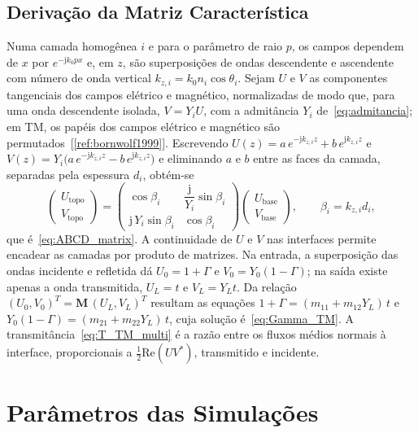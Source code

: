 \documentclass[12pt,a4paper,oneside]{book}
\theoremstyle{remark}
\newcommand{\jj}{\mathrm{j}}
\newcommand{\citar}[1]{[\ref{ref:#1}]}
\theoremstyle{plain}
\theoremstyle{definition}
\begin{document}
\section{Derivação da Matriz Característica}
\label{app:abcd_deriv}

Numa camada homogênea $i$ e para o parâmetro de raio $p$, os campos dependem de
$x$ por $e^{-\jj k_0px}$ e, em $z$, são superposições de ondas descendente e
ascendente com número de onda vertical $k_{z,i}=k_0n_i\cos\theta_i$. Sejam $U$ e
$V$ as componentes tangenciais dos campos elétrico e magnético, normalizadas de
modo que, para uma onda descendente isolada, $V=Y_iU$, com a admitância $Y_i$
de~\eqref{eq:admitancia}; em TM, os papéis dos campos elétrico e magnético são
permutados~\citar{bornwolf1999}. Escrevendo
$U(z)=a\,e^{-\jj k_{z,i}z}+b\,e^{\jj k_{z,i}z}$ e
$V(z)=Y_i\big(a\,e^{-\jj k_{z,i}z}-b\,e^{\jj k_{z,i}z}\big)$ e eliminando $a$ e $b$
entre as faces da camada, separadas pela espessura $d_i$, obtém-se
\[
  \begin{pmatrix}U_{\text{topo}}\\V_{\text{topo}}\end{pmatrix}=
  \begin{pmatrix}\cos\beta_i & \dfrac{\jj}{Y_i}\sin\beta_i\\[6pt] \jj\,Y_i\sin\beta_i & \cos\beta_i\end{pmatrix}
  \begin{pmatrix}U_{\text{base}}\\V_{\text{base}}\end{pmatrix},\qquad \beta_i=k_{z,i}d_i ,
\]
que é~\eqref{eq:ABCD_matrix}. A continuidade de $U$ e $V$ nas interfaces permite
encadear as camadas por produto de matrizes. Na entrada, a superposição das ondas
incidente e refletida dá $U_0=1+\Gamma$ e $V_0=Y_0(1-\Gamma)$; na saída existe
apenas a onda transmitida, $U_L=t$ e $V_L=Y_Lt$. Da relação
$(U_0,V_0)^T=\mathbf M\,(U_L,V_L)^T$ resultam as equações
$1+\Gamma=(m_{11}+m_{12}Y_L)\,t$ e $Y_0(1-\Gamma)=(m_{21}+m_{22}Y_L)\,t$, cuja
solução é~\eqref{eq:Gamma_TM}. A transmitância~\eqref{eq:T_TM_multi} é a razão
entre os fluxos médios normais à interface, proporcionais a
$\tfrac12\mathrm{Re}(UV^\ast)$, transmitido e incidente.

\chapter{Parâmetros das Simulações}
\label{app:parametros}
\end{document}
